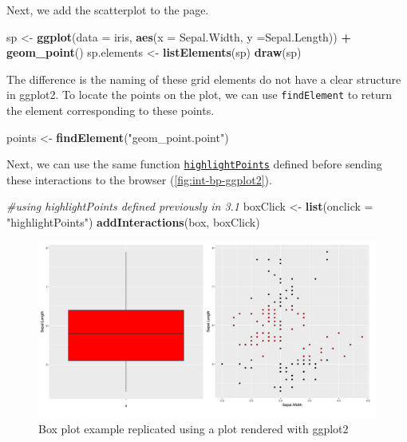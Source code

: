 \documentclass[11pt,]{report}
\newenvironment{Shaded}{\begin{snugshade}}{\end{snugshade}}
\newcommand{\KeywordTok}[1]{\textcolor[rgb]{0.13,0.29,0.53}{\textbf{#1}}}
\newcommand{\DataTypeTok}[1]{\textcolor[rgb]{0.13,0.29,0.53}{#1}}
\newcommand{\StringTok}[1]{\textcolor[rgb]{0.31,0.60,0.02}{#1}}
\newcommand{\CommentTok}[1]{\textcolor[rgb]{0.56,0.35,0.01}{\textit{#1}}}
\newcommand{\OperatorTok}[1]{\textcolor[rgb]{0.81,0.36,0.00}{\textbf{#1}}}
\newcommand{\NormalTok}[1]{#1}
\begin{document}
Next, we add the scatterplot to the page.

\begin{Shaded}
\begin{Highlighting}[]
\NormalTok{sp <-}\StringTok{ }\KeywordTok{ggplot}\NormalTok{(}\DataTypeTok{data =}\NormalTok{ iris, }\KeywordTok{aes}\NormalTok{(}\DataTypeTok{x =}\NormalTok{ Sepal.Width, }\DataTypeTok{y =}\NormalTok{Sepal.Length)) }\OperatorTok{+}\StringTok{ }\KeywordTok{geom_point}\NormalTok{()}
\NormalTok{sp.elements <-}\StringTok{ }\KeywordTok{listElements}\NormalTok{(sp)}
\KeywordTok{draw}\NormalTok{(sp)}
\end{Highlighting}
\end{Shaded}

The difference is the naming of these grid elements do not have a clear
structure in \textsf{ggplot2}. To locate the points on the plot, we can
use \texttt{findElement} to return the element corresponding to these
points.

\begin{Shaded}
\begin{Highlighting}[]
\NormalTok{points <-}\StringTok{ }\KeywordTok{findElement}\NormalTok{(}\StringTok{"geom_point.point"}\NormalTok{)}
\end{Highlighting}
\end{Shaded}

Next, we can use the same function
\protect\hyperlink{highlightPoints}{\texttt{highlightPoints}} defined
before sending these interactions to the browser
(\autoref{fig:int-bp-ggplot2}).

\begin{Shaded}
\begin{Highlighting}[]
\CommentTok{#using highlightPoints defined previously in 3.1}
\NormalTok{boxClick <-}\StringTok{ }\KeywordTok{list}\NormalTok{(}\DataTypeTok{onclick =} \StringTok{"highlightPoints"}\NormalTok{)}
\KeywordTok{addInteractions}\NormalTok{(box, boxClick)}
\end{Highlighting}
\end{Shaded}

\begin{figure}[H]

{\centering \includegraphics[width=0.7\linewidth,]{./fig/int-bp-ggplot2} 

}

\caption{\label{fig:int-bp-ggplot2} Box plot example replicated using a plot rendered with ggplot2}\label{fig:unnamed-chunk-88}
\end{figure}
\end{document}
